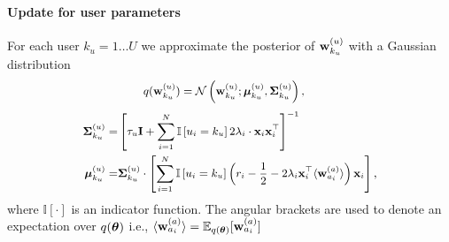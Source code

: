 \paragraph{Update for user parameters}
\noindent For each user $k_u=1\dots U$ we approximate the posterior of $\mathbf{w}^{(u)}_{k_u}$ with a Gaussian distribution 
\begin{equation}
\begingroup\makeatletter\def\f@size{\fsize}\check@mathfonts
\def\maketag@@@#1{\hbox{\m@th\large\normalfont#1}}%
\begin{aligned}
& q(\w^{(u)}_{k_u})=\mathcal{N}\left(\textbf{w}^{(u)}_{k_u}; \bmu^{(u)}_{k_u}, \bSigma^{(u)}_{k_u} \right), 
\label{eq:q_u}
\end{aligned}\endgroup
\end{equation} 
\begin{equation}
\begingroup\makeatletter\def\f@size{\fsize}\check@mathfonts
\def\maketag@@@#1{\hbox{\m@th\large\normalfont#1}}%
\begin{aligned}
\bSigma^{(u)}_{k_u} = &\left[\tau_u \I +\sum_{i=1}^N \mathbb{I}\left[u_i=k_u\right]2\lambda_i \cdot \x_i\x_i^\top  \right]^{-1} \\ \nonumber
\bmu^{(u)}_{k_u}= & \bSigma^{(u)}_{k_u} \cdot\left[\sum_{i=1}^N \mathbb{I}\left[u_i=k_u\right]   \left(r_i-\frac{1}{2} - 2\lambda_i \x_i^\top \langle \textbf{w}^{(a)}_{a_i} \rangle \right) \x_i \right],
\end{aligned}\endgroup
\end{equation} 
where $\mathbb{I}\left[ \cdot \right]$ is an indicator function. 
The angular brackets are used to denote an expectation over $q(\bm{\theta})$ i.e., $\langle \mathbf{w}^{(a)}_{a_i}\rangle = \mathbb{E}_{q(\bm{\theta})} [ \mathbf{w}^{(a)}_{a_i}  ]$
 


